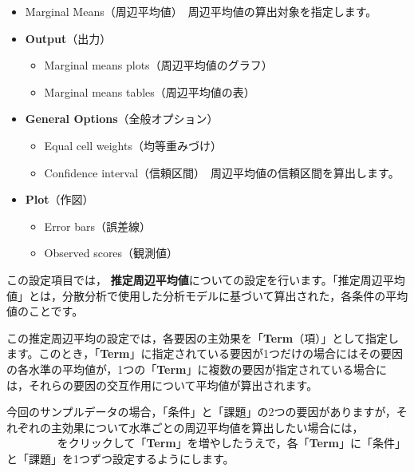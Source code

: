 \documentclass[
  12pt,
  a5jpaper,
  lualatex, ja=standard]{bxjsbook}
\providecommand{\tightlist}{%
  \setlength{\itemsep}{0pt}\setlength{\parskip}{0pt}}
\renewcommand{\emph}[1]{\textbf{\color{emph} #1}}
\newenvironment{jmvsettings}{%
	\begin{center}%
	\begin{tcolorbox}[%
		title=設定項目,
		colframe=gmoji,
		colbacktitle=gmoji,
		colback=gmoji!2!white,
		breakable,
		width=.9\textwidth,
		]\small\addtolength{\leftmargini}{-3\labelsep}%
	}%
	{\end{tcolorbox}\end{center}}
\begin{document}
\begin{jmvsettings}

\begin{itemize}
\tightlist
\item
  Marginal Means（周辺平均値）　周辺平均値の算出対象を指定します。
\item
  \textbf{Output}（出力）

  \begin{itemize}
  \tightlist
  \item
    Marginal means plots（周辺平均値のグラフ）
  \item
    Marginal means tables（周辺平均値の表）
  \end{itemize}
\item
  \textbf{General Options}（全般オプション）

  \begin{itemize}
  \tightlist
  \item
    Equal cell weights（均等重みづけ）
  \item
    Confidence interval（信頼区間）　周辺平均値の信頼区間を算出します。
  \end{itemize}
\item
  \textbf{Plot}（作図）

  \begin{itemize}
  \tightlist
  \item
    Error bars（誤差線）
  \item
    Observed scores（観測値）
  \end{itemize}
\end{itemize}

\end{jmvsettings}

この設定項目では，\emph{推定周辺平均値}についての設定を行います。「推定周辺平均値」とは，分散分析で使用した分析モデルに基づいて算出された，各条件の平均値のことです。

この推定周辺平均の設定では，各要因の主効果を「\textbf{Term}（項）」として指定します。このとき，「\textbf{Term}」に指定されている要因が1つだけの場合にはその要因の各水準の平均値が，1つの「\textbf{Term}」に複数の要因が指定されている場合には，それらの要因の交互作用について平均値が算出されます。

今回のサンプルデータの場合，「条件」と「課題」の2つの要因がありますが，それぞれの主効果について水準ごとの周辺平均値を算出したい場合には，\colorbox{ao}{\textcolor{white}{+Add New Term}}をクリックして「\textbf{Term}」を増やしたうえで，各「\textbf{Term}」に「条件」と「課題」を1つずつ設定するようにします。
\end{document}
